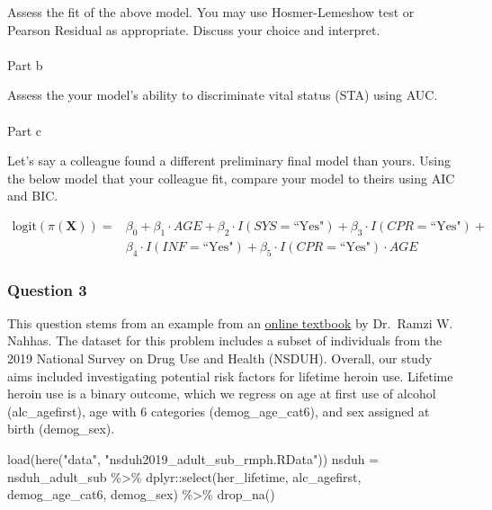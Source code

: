 \documentclass[
  letterpaper,
  DIV=11,
  numbers=noendperiod]{scrartcl}
\makeatletter
\let\oldparagraph\paragraph
\renewcommand{\paragraph}{
    \@ifstar
      \xxxParagraphStar
      \xxxParagraphNoStar
  }
\newcommand{\xxxParagraphStar}[1]{\oldparagraph*{#1}\mbox{}}
\newcommand{\xxxParagraphNoStar}[1]{\oldparagraph{#1}\mbox{}}
\newenvironment{Shaded}{\begin{snugshade}}{\end{snugshade}}
\newcommand{\FunctionTok}[1]{\textcolor[rgb]{0.28,0.35,0.67}{#1}}
\newcommand{\NormalTok}[1]{\textcolor[rgb]{0.00,0.23,0.31}{#1}}
\newcommand{\OtherTok}[1]{\textcolor[rgb]{0.00,0.23,0.31}{#1}}
\newcommand{\SpecialCharTok}[1]{\textcolor[rgb]{0.37,0.37,0.37}{#1}}
\newcommand{\StringTok}[1]{\textcolor[rgb]{0.13,0.47,0.30}{#1}}
\makeatother
\begin{document}
Assess the fit of the above model. You may use Hosmer-Lemeshow test or
Pearson Residual as appropriate. Discuss your choice and interpret.

\paragraph{Part b}\label{part-b-1}

Assess the your model's ability to discriminate vital status (STA) using
AUC.

\paragraph{Part c}\label{part-c-1}

Let's say a colleague found a different preliminary final model than
yours. Using the below model that your colleague fit, compare your model
to theirs using AIC and BIC.

\[\begin{align} \text{logit}(\pi(\textbf{X})) = & \beta_0 + \beta_1 \cdot AGE + \beta_2 \cdot I(SYS=\text{``Yes"}) + \beta_3 \cdot I(CPR=\text{``Yes"}) + \\ & \beta_4 \cdot I(INF=\text{``Yes"}) + \beta_5 \cdot I(CPR=\text{``Yes"}) \cdot AGE \end{align}\]

\subsubsection{Question 3}\label{question-3}

This question stems from an example from an
\href{https://bookdown.org/rwnahhas/RMPH/}{online textbook} by Dr.~Ramzi
W. Nahhas. The dataset for this problem includes a subset of individuals
from the 2019 National Survey on Drug Use and Health (NSDUH). Overall,
our study aims included investigating potential risk factors for
lifetime heroin use. Lifetime heroin use is a binary outcome, which we
regress on age at first use of alcohol (alc\_agefirst), age with 6
categories (demog\_age\_cat6), and sex assigned at birth (demog\_sex).

\begin{Shaded}
\begin{Highlighting}[]
\FunctionTok{load}\NormalTok{(}\FunctionTok{here}\NormalTok{(}\StringTok{"data"}\NormalTok{, }\StringTok{"nsduh2019\_adult\_sub\_rmph.RData"}\NormalTok{))}
\NormalTok{nsduh }\OtherTok{=}\NormalTok{ nsduh\_adult\_sub }\SpecialCharTok{\%\textgreater{}\%} 
\NormalTok{  dplyr}\SpecialCharTok{::}\FunctionTok{select}\NormalTok{(her\_lifetime, alc\_agefirst, demog\_age\_cat6, demog\_sex) }\SpecialCharTok{\%\textgreater{}\%} 
  \FunctionTok{drop\_na}\NormalTok{()}
\end{Highlighting}
\end{Shaded}
\end{document}
